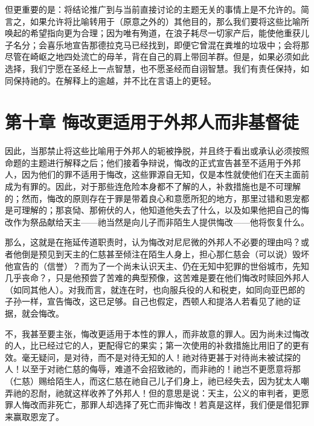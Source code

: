 但更重要的是：将结论推广到与当前直接讨论的主题无关的事情上是不允许的。简言之，如果允许将比喻转用于（原意之外的）其他目的，那么我们要将这些比喻所唤起的希望指向更为合理；因为唯有殉道，在浪子耗尽一切家产后，能使他重获儿子名分；会喜乐地宣告那德拉克马已经找到，即便它曾混在粪堆的垃圾中；会将那尽管在崎岖之地四处流亡的母羊，背在自己的肩上带回羊群。但是，如果必须如此选择，我们宁愿在圣经上一点智慧，也不愿圣经而自诩智慧。我们有责任保持，如同保持祂的。在解释上的逾越，并不比在言语上的更轻。\par


\section{第十章  悔改更适用于外邦人而非基督徒}

因此，当那禁止将这些比喻用于外邦人的轭被挣脱，并且终于看出或承认必须按照命题的主题进行解释之后；他们接着争辩说，悔改的正式宣告甚至不适用于外邦人，因为他们的罪不适用于悔改，这些罪源自无知，仅是本性就使他们在天主面前成为有罪的。因此，对于那些连危险本身都不了解的人，补救措施也是不可理解的；然而，悔改的原则存在于罪是带着良心和意愿所犯的地方，那里过错和恩宠都是可理解的；那哀恸、那俯伏的人，他知道他失去了什么，以及如果他把自己的悔改作为祭品献给天主——祂当然是向儿子而非陌生人提供悔改——他将恢复什么。\par

那么，这就是在拖延传道职责时，认为悔改对尼尼微的外邦人不必要的理由吗？或者他倒是预见到天主的仁慈甚至倾注在陌生人身上，担心那仁慈会（可以说）毁坏他宣告的（信誉）？而为了一个尚未认识天主、仍在无知中犯罪的世俗城市，先知几乎丧命？，只是他预尝了苦难的典型预像，这苦难是要在他们悔改时赎回外邦人（如同其他人）。对我而言，就连在时，也向服兵役的人和税吏，如同向亚巴郎的子孙一样，宣告悔改，这已足够。自己也假定，西顿人和提洛人若看见了祂的证据，就会悔改。\par

不，我甚至要主张，悔改更适用于本性的罪人，而非故意的罪人。因为尚未过悔改的人，比已经过它的人，更配得它的果实；第一次使用的补救措施比用旧了的更有效。毫无疑问，是对待，而不是对待无知的人！祂对待更甚于对待尚未被试探的人！以至于对祂仁慈的侮辱，难道不会招致祂的，而非祂的！祂岂不更愿意将那（仁慈）赐给陌生人，而这仁慈在祂自己儿子们身上，祂已经失去，因为犹太人嘲弄祂的忍耐，祂就这样收养了外邦人！但的意思是说：天主，公义的审判者，更愿罪人悔改而非死亡，那罪人却选择了死亡而非悔改！若真是这样，我们便是借犯罪来赢取恩宠了。\par

